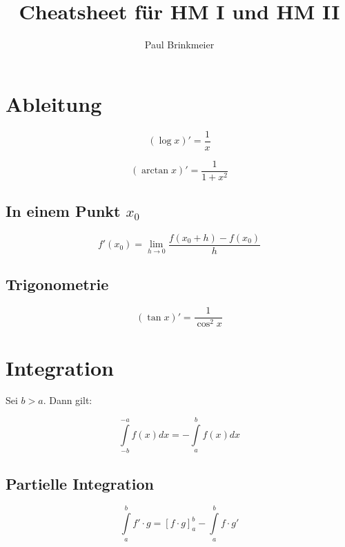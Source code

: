 \documentclass[a4paper, 16pt]{article}
\author{Paul Brinkmeier}
\title{Cheatsheet für HM I und HM II}
\begin{document}
	\maketitle
	\newpage
	\tableofcontents
	\newpage

	\section{Ableitung}

	\begin{equation*}
		(\log{x})' = \frac{1}{x}
	\end{equation*}

	\begin{equation*}
		(\arctan{x})' = \frac{1}{1 + x^2}
	\end{equation*}

	\subsection{In einem Punkt $x_0$}

	\begin{equation*}
		f'(x_0) = \lim\limits_{h \to 0}{\frac{f(x_0 + h) - f(x_0)}{h}}
	\end{equation*}

	\subsection{Trigonometrie}

	\begin{equation*}
		(\tan{x})' = \frac{1}{\cos^2{x}}
	\end{equation*}

	\section{Integration}

	Sei $b > a$. Dann gilt:

	\begin{equation*}
		\int\limits_{-b}^{-a}{f(x)dx} = -\int\limits_{a}^{b}{f(x)dx}
	\end{equation*}

	\subsection{Partielle Integration}

	\begin{equation*}
		\int\limits_{a}^{b}{f' \cdot g} = \left[f \cdot g\right]_{a}^{b} - \int\limits_{a}^{b}{f \cdot g'}
	\end{equation*}
\end{document}

